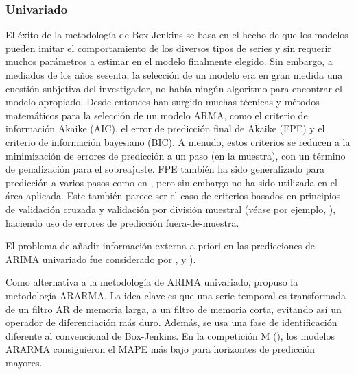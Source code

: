 \documentclass{llncs}
\begin{document}
\begin{table}
\caption{Lista de ejemplos de aplicaciones reales}
\end{table}
\subsubsection{Univariado}

El éxito de la metodología de Box-Jenkins se basa en el hecho de que los modelos pueden imitar el comportamiento de los diversos tipos de series y sin requerir muchos parámetros a estimar en el modelo finalmente elegido. Sin embargo, a mediados de los años sesenta, la selección de un modelo era en gran medida una cuestión subjetiva del investigador, no había ningún algoritmo para encontrar el modelo apropiado. Desde entonces han surgido muchas técnicas y métodos matemáticos para la selección de un modelo ARMA, como el criterio de información Akaike (AIC), el error de predicción final de Akaike (FPE) y el criterio de información bayesiano (BIC). A menudo, estos criterios se reducen a la minimización de errores de predicción a un paso (en la muestra), con un término de penalización para el sobreajuste. FPE también ha sido generalizado para predicción a varios pasos como en \cite{Bhansali1999295}, pero sin embargo no ha sido utilizada en el área aplicada. Este también parece ser el caso de criterios basados en principios de validación cruzada y validación por división muestral (véase por ejemplo, \cite{West19961084}), haciendo uso de errores de predicción fuera-de-muestra.

El problema de añadir información externa a priori en las predicciones de ARIMA univariado fue considerado por  \cite{Cholette1982375}, \cite{Guerrero1991339} y \cite{deAlba199395}).

Como alternativa a la metodología de ARIMA univariado, \cite{Parzen198267} propuso la metodología ARARMA. La idea clave es que una serie temporal es transformada de un filtro AR de memoria larga, a un filtro de memoria corta, evitando así un operador de diferenciación más duro. Además, se usa una fase de identificación diferente al convencional de Box-Jenkins. En la competición M (\cite{Makridakis1982111}), los modelos ARARMA consiguieron el MAPE más bajo para horizontes de predicción mayores. 
\end{document}
